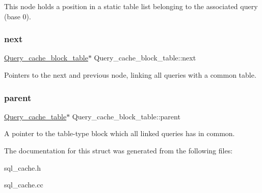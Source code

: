 This node holds a position in a static table list belonging to the associated query (base 0). \mbox{\label{structQuery__cache__block__table_a98a811e0dd09e8df360c267125ef0ba3}} 
\subsubsection{\texorpdfstring{next}{next}}
{\footnotesize\ttfamily \mbox{\hyperlink{structQuery__cache__block__table}{Query\+\_\+cache\+\_\+block\+\_\+table}}$\ast$ Query\+\_\+cache\+\_\+block\+\_\+table\+::next}

Pointers to the next and previous node, linking all queries with a common table. \mbox{\label{structQuery__cache__block__table_a8691dff022dcd857e42fc7ece18c0dc9}} 
\subsubsection{\texorpdfstring{parent}{parent}}
{\footnotesize\ttfamily \mbox{\hyperlink{structQuery__cache__table}{Query\+\_\+cache\+\_\+table}}$\ast$ Query\+\_\+cache\+\_\+block\+\_\+table\+::parent}

A pointer to the table-\/type block which all linked queries has in common. 

The documentation for this struct was generated from the following files\+:\begin{DoxyCompactItemize}
\item 
sql\+\_\+cache.\+h\item 
sql\+\_\+cache.\+cc\end{DoxyCompactItemize}
